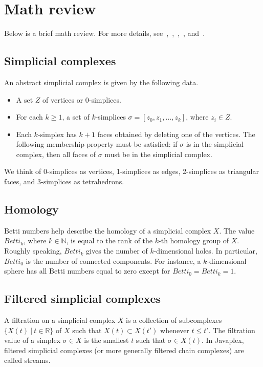 \documentclass[amscd, amssymb, verbatim]{amsart}[12pt]
\theoremstyle{remark}
\theoremstyle{remark}
\theoremstyle{remark}
\newcommand{\N}{\mathbb{N}}
\newcommand{\R}{\mathbb{R}}
\begin{document}
\section{Math review}

Below is a brief math review. For more details, see~\citet{Armstrong},~\citet{ComputationalTopology},~\citet{TopologicalPersistence},~\citet{Hatcher}, and~\citet{ComputingPersistent}. 


\subsection{Simplicial complexes}
An abstract simplicial complex is given by the following data.
\begin{itemize}
\item A set $Z$ of vertices or 0-simplices.
\item For each $k\geq 1$, a set of $k$-simplices $\sigma = [z_0,z_1,\ldots,z_k]$, where $z_i\in Z$.
\item Each $k$-simplex has $k+1$ faces obtained by deleting one of the vertices. The following membership property must be satisfied: if $\sigma$ is in the simplicial complex, then all faces of $\sigma$ must be in the simplicial complex.
\end{itemize}
We think of 0-simplices as vertices, 1-simplices as edges, 2-simplices as triangular faces, and 3-simplices as tetrahedrons. 


\subsection{Homology}
Betti numbers help describe the homology of a simplicial complex $X$. The value $Betti_k$, where $k\in \N$, is equal to the rank of the $k$-th homology group of $X$. Roughly speaking, $Betti_k$ gives the number of $k$-dimensional holes. In particular, $Betti_0$ is the number of connected components. For instance, a $k$-dimensional sphere has all Betti numbers equal to zero except for $Betti_0 = Betti_k = 1$. 


\subsection{Filtered simplicial complexes}
A filtration on a simplicial complex $X$ is a collection of subcomplexes $\{X(t) \ |\ t\in \R\}$ of $X$ such that $X(t) \subset X(t')$ whenever $t\leq t'$. The filtration value of a simplex $\sigma \in X$ is the smallest $t$ such that $\sigma \in X(t)$. In Javaplex, filtered simplicial complexes (or more generally filtered chain complexes) are called streams. 
\end{document}
